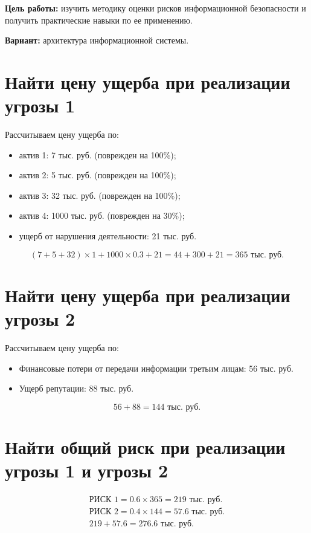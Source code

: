 \documentclass{bsuir}
\begin{document}
\maketitle
\mainmatter

\textbf{Цель работы:} изучить методику оценки рисков информационной безопасности и получить
практические навыки по ее применению.

\textbf{Вариант:} архитектура информационной системы.

\section{Найти цену ущерба при реализации угрозы 1}

Рассчитываем цену ущерба по:

\begin{itemize}
    \item актив 1: 7 тыс. руб. (поврежден на 100\%);
    \item актив 2: 5 тыс. руб. (поврежден на 100\%);
    \item актив 3: 32 тыс. руб. (поврежден на 100\%);
    \item актив 4: 1000 тыс. руб. (поврежден на 30\%);
    \item ущерб от нарушения деятельности: 21 тыс. руб.
\end{itemize}

\[
(7+5+32) \times 1 + 1000 \times 0.3 + 21 = 44 + 300 + 21 = 365 \text{ тыс. руб.}
\]

\section{Найти цену ущерба при реализации угрозы 2}

Рассчитываем цену ущерба по:

\begin{itemize}
    \item Финансовые потери от передачи информации третьим лицам: 56 тыс. руб.
    \item Ущерб репутации: 88 тыс. руб.
\end{itemize}

\[
56 + 88 = 144 \text{ тыс. руб.}
\]

\section{Найти общий риск при реализации угрозы 1 и угрозы 2}

\begin{align*}
\text{РИСК 1} = 0.6 \times 365 = 219 \text{ тыс. руб.} \\
\text{РИСК 2}= 0.4 \times 144 = 57.6 \text{ тыс. руб.}\\
219 + 57.6 = 276.6 \text{ тыс. руб.}
\end{align*}
\end{document}
